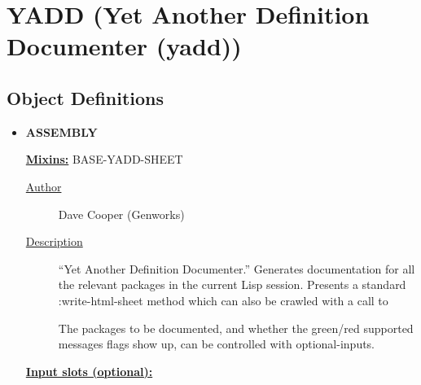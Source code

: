 \documentclass [11pt]{book}
\begin{document}
\section{YADD (Yet Another Definition Documenter (yadd))}

\label{sec:yadd(yetanotherdefinitiondocumenter(yadd))}





\subsection{Object Definitions}

\label{subsec:objectdefinitions}



\begin{itemize}

\item {}
\textbf{ASSEMBLY}


\textbf{
\underline{Mixins:}} BASE-YADD-SHEET





\begin{description}

\item [
\underline{Author}]


Dave Cooper (Genworks)



\item [
\underline{Description}]


``Yet Another Definition Documenter.'' Generates 
documentation for all the relevant packages in the current Lisp session. Presents a 
standard :write-html-sheet method which can also be crawled with a call to 


The packages to be documented, and whether the green/red supported 
messages flags show up, can be controlled with optional-inputs.



\end{description}








\textbf{
\underline{Input slots (optional):}}

\begin{description}


\end{description}
\end{itemize}
\end{document}
